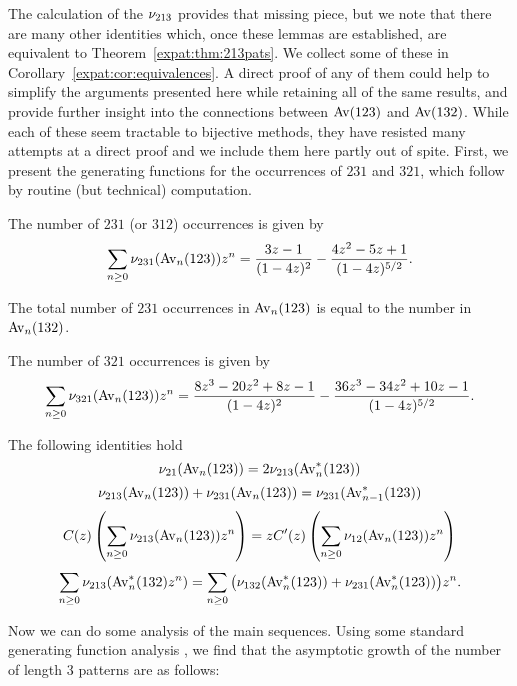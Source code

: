     The calculation of the $\nu_{213}$ provides that missing piece, but we
    note that there are many other identities which, once these lemmas are
    established, are equivalent to Theorem~\ref{expat:thm:213pats}. We collect
    some of these in Corollary~\ref{expat:cor:equivalences}. A direct proof of
    any of them could help to simplify the arguments presented here while
    retaining all of the same results, and provide further insight into the
    connections between $\operatorname{{Av}}(123)$ and $\operatorname{{Av}}(132)$. While each of these
    seem tractable to bijective methods, they have resisted many attempts at a
    direct proof  and we include them here partly out of spite.
    First, we present the generating functions for the occurrences of $231$ and
    $321$, which follow by routine (but technical) computation. 
    
    \begin{theorem} \label{expat:thm:231pats}
      The number of $231$ (or $312$) occurrences is given by 
      $$\sum_{n \geq 0} \nu_{231}(\operatorname{{Av}}_n(123)) z^n=
      \frac{3z-1}{(1-4z)^{2}} - \frac{4z^2 - 5z + 1}{(1-4z)^{5/2}}.$$
    \end{theorem}

    \begin{corollary} \label{expat:cor:bridge}
      The total number of $231$ occurrences in $\operatorname{{Av}}_n(123)$ is equal to the
      number in $\operatorname{{Av}}_n(132)$. 
    \end{corollary}

    \begin{theorem}
      The number of $321$ occurrences is given by 
      $$
        \sum_{n\geq 0} \nu_{321}(\operatorname{{Av}}_n (123)) z^n =
        \frac{ 8z^3 - 20z^2 + 8z - 1}{(1-4z)^{2}}
        - \frac{36z^3 - 34z^2 + 10z - 1}{(1-4z)^{5/2}}.
      $$
    \end{theorem}

    \begin{corollary} \label{expat:cor:equivalences}
      The following identities hold 
      $$ \nu_{21}(\operatorname{{Av}}_n(123)) = 2\nu_{213}(\operatorname{{Av}}_n^*(123)) $$
      $$ \nu_{213}(\operatorname{{Av}}_n(123)) + \nu_{231}(\operatorname{{Av}}_n(123)) = \nu_{231} (\operatorname{{Av}}
      _{n-1}^*(123))$$
      $$ C(z) \left(\sum_{n\geq 0} \nu_{213}(\operatorname{{Av}}_n(123)) z^n \right) =
        z C'(z) \left(\sum_{n \geq 0} \nu_{12}(\operatorname{{Av}}_n(123))z^n \right) $$
      $$ \sum_{n\geq 0} \nu_{213} (\operatorname{{Av}}_n^* (132)  z^n) =
        \sum_{n \geq 0} \big(\nu_{132}(\operatorname{{Av}}_n^*(123)) +
        \nu_{231}(\operatorname{{Av}}_n^*(123))\big)z^n. $$
    \end{corollary}

  Now we can do some analysis of the main sequences. Using some
  standard generating function analysis \cite{flajolet}, we find
  that the asymptotic growth of the number of length $3$ patterns are
  as follows:

